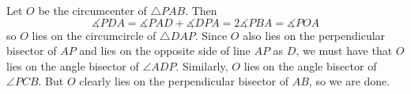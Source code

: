 Let $O$ be the circumcenter of $\triangle{PAB}$. Then
\[
	\measuredangle{PDA}=\measuredangle{PAD}+\measuredangle{DPA}=2\measuredangle{PBA}=\measuredangle{POA}
\]
so $O$ lies on the circumcircle of $\triangle{DAP}$. Since $O$ also lies on the perpendicular bisector of $AP$ and lies on the opposite side of line $AP$ as $D$, we must have that $O$ lies on the angle bisector of $\angle{ADP}$. Similarly, $O$ lies on the angle bisector of $\angle{PCB}$. But $O$ clearly lies on the perpendicular bisector of $AB$, so we are done.

